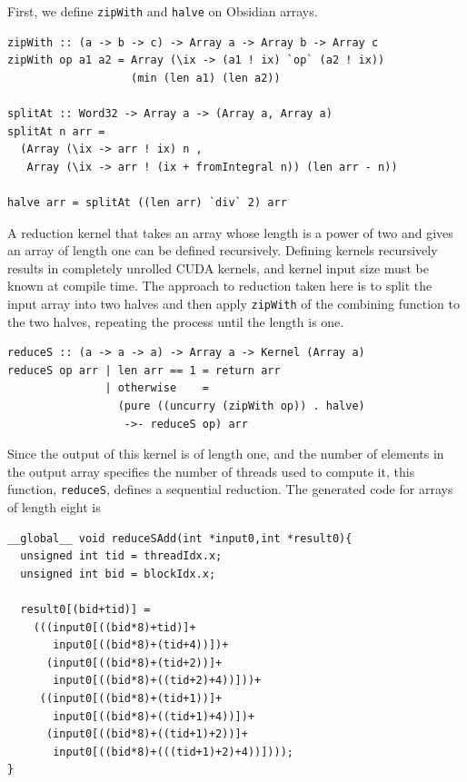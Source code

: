 \documentclass[]{sigplanconf}
\begin{document}
First, we define {\tt zipWith} and {\tt halve} on Obsidian arrays.
\begin{codesize} 
\begin{verbatim}
zipWith :: (a -> b -> c) -> Array a -> Array b -> Array c
zipWith op a1 a2 = Array (\ix -> (a1 ! ix) `op` (a2 ! ix)) 
                   (min (len a1) (len a2))

splitAt :: Word32 -> Array a -> (Array a, Array a) 
splitAt n arr = 
  (Array (\ix -> arr ! ix) n , 
   Array (\ix -> arr ! (ix + fromIntegral n)) (len arr - n))

halve arr = splitAt ((len arr) `div` 2) arr
\end{verbatim}
\end{codesize}
A reduction kernel that takes an array whose length is a power of two 
and gives an array of length one can be defined recursively. 
Defining kernels recursively results in completely unrolled CUDA kernels,
and kernel input size must be known at compile time.
The approach to reduction taken here is to split the input array 
into two halves and then apply {\tt zipWith} of the combining function to the 
two halves, repeating the process until the length is one. 
\begin{codesize} 
\begin{verbatim}
reduceS :: (a -> a -> a) -> Array a -> Kernel (Array a) 
reduceS op arr | len arr == 1 = return arr
               | otherwise    = 
                 (pure ((uncurry (zipWith op)) . halve)
                  ->- reduceS op) arr
\end{verbatim}
\end{codesize}
Since the output of this kernel is of length one, and the number 
of elements in the output array specifies the number of threads used to compute it, 
this function, {\tt reduceS}, defines a sequential reduction. 
The generated code for arrays of length eight is 
\pagebreak
\begin{codesize} 
\begin{verbatim}
__global__ void reduceSAdd(int *input0,int *result0){
  unsigned int tid = threadIdx.x;
  unsigned int bid = blockIdx.x;
  
  result0[(bid+tid)] = 
    (((input0[((bid*8)+tid)]+
       input0[((bid*8)+(tid+4))])+
      (input0[((bid*8)+(tid+2))]+
       input0[((bid*8)+((tid+2)+4))]))+
     ((input0[((bid*8)+(tid+1))]+
       input0[((bid*8)+((tid+1)+4))])+
      (input0[((bid*8)+((tid+1)+2))]+
       input0[((bid*8)+(((tid+1)+2)+4))])));
}
\end{verbatim}
\end{codesize}
\end{document}
